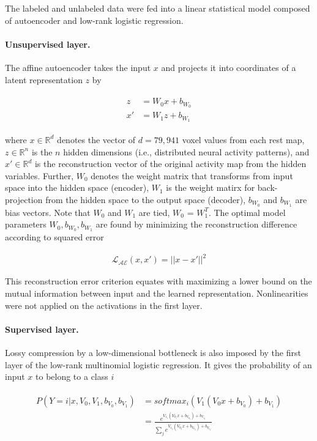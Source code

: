 \documentclass{article} %
\begin{document}
The labeled and unlabeled data were fed into a linear statistical model
composed of autoencoder and low-rank logistic regression.

\paragraph{Unsupervised layer.}
The affine autoencoder takes the input 
$x$ and projects it into coordinates of a latent representation $z$
by

\begin{eqnarray}
  \begin{split}
  z &= W_0 x + b_{W_0} \\
  x' &= W_1 z + b_{W_1}
  \end{split}
  \label{eq:autoenc}
\end{eqnarray}

where $x \in \mathbb{R}^{d}$ denotes the vector of $d=79,941$
voxel values from each
rest map, $z \in \mathbb{R}^{n}$ is the $n$ hidden dimensions (i.e.,
distributed neural activity patterns), and 
$x' \in \mathbb{R}^{d}$ is the reconstruction vector of the original activity map
from the hidden variables. Further, ${W_0}$ denotes the weight matrix that
transforms
from input space into the hidden space (encoder),
${W_1}$ is the weight matirx for back-projection from the hidden space to the
output space (decoder), ${b_{W_0}}$ and ${b_{W_1}}$ are bias vectors.
Note that ${W_0}$ and ${W_1}$ are tied,
$W_0$ = $W_1^T$.
The optimal model parameters ${W_0}, {b_{W_0}}, {b_{W_1}}$ are found by
minimizing the reconstruction difference according to squared error

\begin{eqnarray}
  {\mathcal{L_{AE}}}(x, x') = || x - x' ||^2
\end{eqnarray}

This reconstruction error criterion equates with
maximizing a lower bound on the mutual information between
input and the learned representation.
Nonlinearities were not applied on the
activations in the first layer.

\paragraph{Supervised layer.}
Lossy compression by a low-dimensional bottleneck
is also imposed by the first layer of the low-rank
multinomial logistic regression.
It gives the probability of an input $x$ to belong
to a class $i$

\begin{eqnarray}
  \begin{split}
    P(Y=i|x, V_0,V_1,b_{V_0}, b_{V_1}) &= softmax_i(V_1 (V_0 x + b_{V_0}) + b_{V_1}) \\
    &= \frac {e^{V_1_i (V_0_i x + b_{V_0}_i) + b_{V_1}_i}} {\sum_j e^{V_1_j (V_0_j x + b_{V_0}_j) + b_{V_1}_j}}            
  \end{split}
  \label{eq:lr}
\end{eqnarray}
\end{document}
